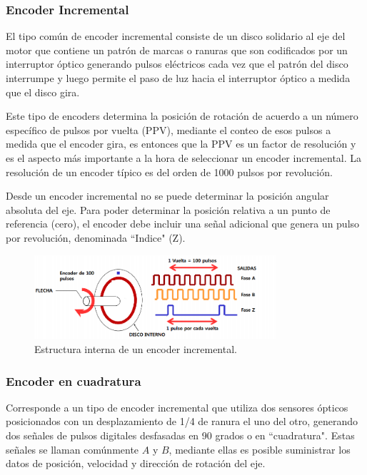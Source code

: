 \documentclass[11pt, a4paper]{article}
\begin{document}
\subsubsection{Encoder Incremental}
 El tipo común de encoder incremental consiste de un disco solidario al eje del motor que contiene un patrón de marcas o ranuras que son codificados por un interruptor óptico generando pulsos eléctricos cada vez que el patrón del disco interrumpe y luego permite el paso de luz hacia el interruptor óptico a medida que el disco gira. 

 Este tipo de encoders determina la posición de rotación de acuerdo a un número específico de pulsos por vuelta (PPV), mediante el conteo de esos pulsos a medida que el encoder gira, es entonces que la PPV es un factor de resolución y es el aspecto más importante a la hora de seleccionar un encoder incremental.  La resolución de un encoder típico es del orden de 1000 pulsos por revolución.

 Desde un encoder incremental no se puede determinar la posición angular absoluta del eje. Para poder determinar la posición relativa a un punto de referencia (cero), el encoder debe incluir una señal adicional que genera un pulso por revolución, denominada ``Indice" (Z).

\begin{figure}[h]
	\centering
	\includegraphics[width=0.8\textwidth]{Imagenes/encoder_incremental.jpg}
	\caption{Estructura interna de un encoder incremental.}
	\label{fig:encoder_incremental}
\end{figure} 

\subsubsection{Encoder en cuadratura}
Corresponde a un tipo de encoder incremental que utiliza dos sensores ópticos posicionados con un desplazamiento de 1/4 de ranura el uno del otro, generando dos señales de pulsos digitales desfasadas en 90 grados o en ``cuadratura". Estas señales se llaman comúnmente $A$ y $B$, mediante ellas es posible suministrar los datos de posición, velocidad y dirección de rotación del eje.
\end{document}

